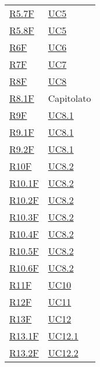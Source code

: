 \begin{center}
\begin{longtable}[!h]{p{50px} p{50px}}
        \hyperref[tab:RequisitiFunzionali]{R5.7F}    & \hyperref[sec:UC5]{UC5}       \\
        \hyperref[tab:RequisitiFunzionali]{R5.8F}    & \hyperref[sec:UC5]{UC5}       \\
        \hyperref[tab:RequisitiFunzionali]{R6F}      & \hyperref[sec:UC6]{UC6}       \\
        \hyperref[tab:RequisitiFunzionali]{R7F}      & \hyperref[sec:UC7]{UC7}       \\
        \hyperref[tab:RequisitiFunzionali]{R8F}      & \hyperref[sec:UC8]{UC8}       \\
        \hyperref[tab:RequisitiFunzionali]{R8.1F}    & Capitolato                    \\
        \hyperref[tab:RequisitiFunzionali]{R9F}      & \hyperref[sec:UC8.1]{UC8.1}   \\
        \hyperref[tab:RequisitiFunzionali]{R9.1F}    & \hyperref[sec:UC8.1]{UC8.1}   \\
        \hyperref[tab:RequisitiFunzionali]{R9.2F}    & \hyperref[sec:UC8.1]{UC8.1}   \\
        \hyperref[tab:RequisitiFunzionali]{R10F}     & \hyperref[sec:UC8.2]{UC8.2}   \\
        \hyperref[tab:RequisitiFunzionali]{R10.1F}   & \hyperref[sec:UC8.2]{UC8.2}   \\
        \hyperref[tab:RequisitiFunzionali]{R10.2F}   & \hyperref[sec:UC8.2]{UC8.2}   \\
        \hyperref[tab:RequisitiFunzionali]{R10.3F}   & \hyperref[sec:UC8.2]{UC8.2}   \\
        \hyperref[tab:RequisitiFunzionali]{R10.4F}   & \hyperref[sec:UC8.2]{UC8.2}   \\
        \hyperref[tab:RequisitiFunzionali]{R10.5F}   & \hyperref[sec:UC8.2]{UC8.2}   \\
        \hyperref[tab:RequisitiFunzionali]{R10.6F}   & \hyperref[sec:UC8.2]{UC8.2}   \\
        \hyperref[tab:RequisitiFunzionali]{R11F}     & \hyperref[sec:UC10]{UC10}     \\
        \hyperref[tab:RequisitiFunzionali]{R12F}     & \hyperref[sec:UC11]{UC11}     \\
        \hyperref[tab:RequisitiFunzionali]{R13F}     & \hyperref[sec:UC12]{UC12}     \\
        \hyperref[tab:RequisitiFunzionali]{R13.1F}   & \hyperref[sec:UC12.1]{UC12.1} \\
        \hyperref[tab:RequisitiFunzionali]{R13.2F}   & \hyperref[sec:UC12.2]{UC12.2} \\

\end{longtable}
\end{center}

